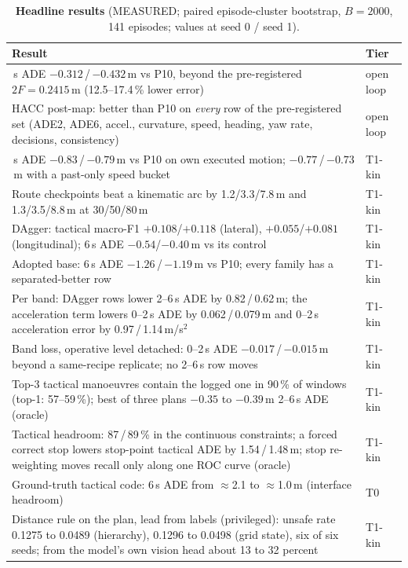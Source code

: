 \documentclass[10pt,twocolumn]{article}
\theoremstyle{remark}
\begin{document}
\begin{table}[!tp]
\centering
\caption{\textbf{Headline results} (MEASURED; paired episode-cluster bootstrap, $B=2000$, 141 episodes; values at seed 0 / seed 1).}
\label{tab:headline}
\small
\begin{tabularx}{\columnwidth}{@{}>{\raggedright\arraybackslash}Xl@{}}
\toprule
Result & Tier \\
\midrule
6\,s ADE $-0.312$\,/\,$-0.432$\,m vs P10, beyond the pre-registered $2F=0.2415$\,m (12.5--17.4\,\% lower error) & open loop \\
HACC post-map: better than P10 on \emph{every} row of the pre-registered set (ADE2, ADE6, accel., curvature, speed, heading, yaw rate, decisions, consistency) & open loop \\
6\,s ADE $-0.83$\,/\,$-0.79$\,m vs P10 on own executed motion; $-0.77$\,/\,$-0.73$\,m with a past-only speed bucket & T1-kin \\
Route checkpoints beat a kinematic arc by 1.2/3.3/7.8\,m and 1.3/3.5/8.8\,m at 30/50/80\,m & T1-kin \\
DAgger: tactical macro-F1 $+0.108$/$+0.118$ (lateral), $+0.055$/$+0.081$ (longitudinal); 6\,s ADE $-0.54$/$-0.40$\,m vs its control & T1-kin \\
Adopted base: 6\,s ADE $-1.26$\,/\,$-1.19$\,m vs P10; every family has a separated-better row & T1-kin \\
Per band: DAgger rows lower 2--6\,s ADE by 0.82\,/\,0.62\,m; the acceleration term lowers 0--2\,s ADE by 0.062\,/\,0.079\,m and 0--2\,s acceleration error by 0.97\,/\,1.14\,m/s$^2$ & T1-kin \\
Band loss, operative level detached: 0--2\,s ADE $-0.017$\,/\,$-0.015$\,m beyond a same-recipe replicate; no 2--6\,s row moves & T1-kin \\
Top-3 tactical manoeuvres contain the logged one in 90\,\% of windows (top-1: 57--59\,\%); best of three plans $-0.35$ to $-0.39$\,m 2--6\,s ADE (oracle) & T1-kin \\
Tactical headroom: 87\,/\,89\,\% in the continuous constraints; a forced correct stop lowers stop-point tactical ADE by 1.54\,/\,1.48\,m; stop re-weighting moves recall only along one ROC curve (oracle) & T1-kin \\
Ground-truth tactical code: 6\,s ADE from $\approx$2.1 to $\approx$1.0\,m (interface headroom) & T0 \\
Distance rule on the plan, lead from labels (privileged): unsafe rate 0.1275 to 0.0489 (hierarchy), 0.1296 to 0.0498 (grid state), six of six seeds; from the model's own vision head about 13 to 32 percent & T1-kin \\

\end{tabularx}
\end{table}
\end{document}
